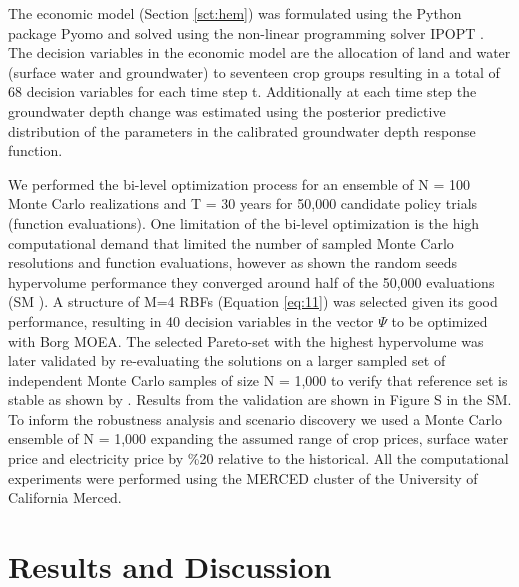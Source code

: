 \documentclass[a4paper,fleqn]{cas-sc}
\begin{document}
The economic model (Section \ref{sct:hem}) was formulated using the Python package Pyomo \citep{hart_pyomo_2011} and solved using the non-linear programming solver IPOPT \citep{wachter_implementation_2006}. The decision variables in the economic model are the allocation of land and water (surface water and groundwater) to seventeen crop groups resulting in a total of 68 decision variables for each time step t. Additionally at each time step the groundwater depth change was estimated using the posterior predictive distribution of the parameters in the calibrated groundwater depth response function.

We performed the bi-level optimization process for an ensemble of N = 100 Monte Carlo realizations and T = 30 years for 50,000 candidate policy trials (function evaluations). One limitation of the bi-level optimization is the high computational demand that limited the number of sampled Monte Carlo resolutions and function evaluations, however as shown the random seeds hypervolume performance they converged around half of the 50,000 evaluations (SM ). A structure of M=4 RBFs (Equation \ref{eq:11}) was selected given its good performance, resulting in 40 decision variables in the vector $\Psi$ to be optimized with Borg MOEA. The selected Pareto-set with the highest hypervolume was later validated by re-evaluating the solutions on a larger sampled set of independent Monte Carlo samples of size N = 1,000 to verify that reference set is stable as shown by \citep{gupta_can_2020}. Results from the validation are shown in Figure S in the SM. To inform the robustness analysis and scenario discovery we used a Monte Carlo ensemble of N = 1,000 expanding the assumed range of crop prices, surface water price and electricity price by \%20 relative to the historical. All the computational experiments were performed using the MERCED cluster of the University of California Merced. 

\section{Results and Discussion}
\end{document}
